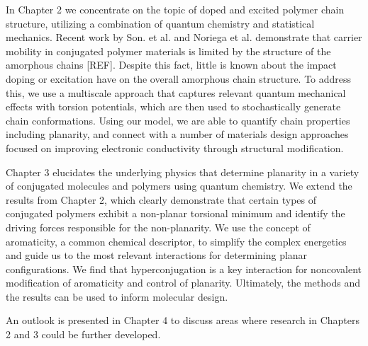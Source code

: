 In Chapter 2 we concentrate on the topic of doped and excited polymer chain structure, utilizing a combination of quantum chemistry and statistical mechanics. Recent work by Son. et al. and Noriega et al. demonstrate that carrier mobility in conjugated polymer materials is limited by the structure of the amorphous chains [REF]. Despite this fact, little is known about the impact doping or excitation have on the overall amorphous chain structure. To address this, we use a multiscale approach that captures relevant quantum mechanical effects with torsion potentials, which are then used to stochastically generate chain conformations. Using our model, we are able to quantify chain properties including planarity, and connect with a number of materials design approaches focused on improving electronic conductivity through structural modification.

Chapter 3 elucidates the underlying physics that determine planarity in a variety of conjugated molecules and polymers using quantum chemistry. We extend the results from Chapter 2, which clearly demonstrate that certain types of conjugated polymers exhibit a non-planar torsional minimum and identify the driving forces responsible for the non-planarity. We use the concept of aromaticity, a common chemical descriptor, to simplify the complex energetics and guide us to the most relevant interactions for determining planar configurations. We find that hyperconjugation is a key interaction for noncovalent modification of aromaticity and control of planarity. Ultimately, the methods and the results can be used to inform molecular design.

An outlook is presented in Chapter 4 to discuss areas where research in Chapters 2 and 3 could be further developed.
